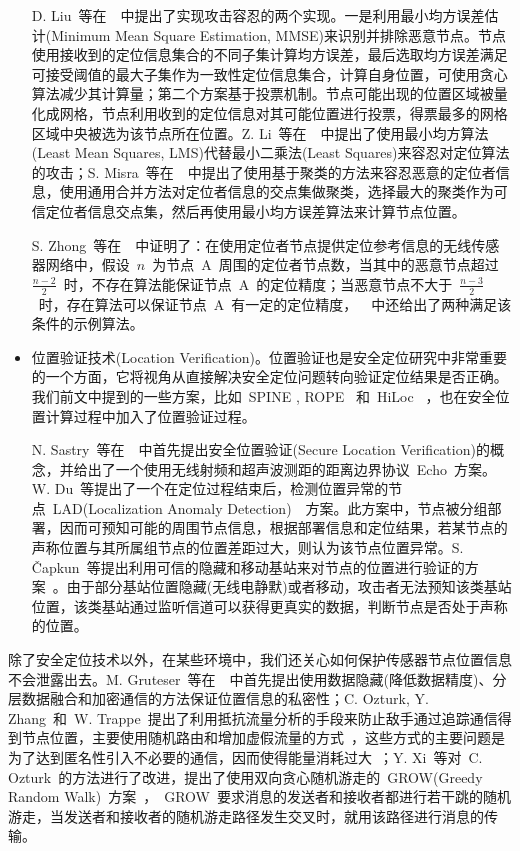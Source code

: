 \documentclass[a4paper,10pt]{article}
\begin{document}
\begin{itemize}
D. Liu~等在~\cite{Liu2005b, Liu2008a}~中提出了实现攻击容忍的两个实现。一是利用最小均方误差估计(Minimum Mean Square Estimation, MMSE)来识别并排除恶意节点。节点使用接收到的定位信息集合的不同子集计算均方误差，最后选取均方误差满足可接受阈值的最大子集作为一致性定位信息集合，计算自身位置，可使用贪心算法减少其计算量；第二个方案基于投票机制。节点可能出现的位置区域被量化成网格，节点利用收到的定位信息对其可能位置进行投票，得票最多的网格区域中央被选为该节点所在位置。Z. Li~等在~\cite{Li2005a}~中提出了使用最小均方算法(Least Mean Squares, LMS)代替最小二乘法(Least Squares)来容忍对定位算法的攻击；S. Misra~等在~\cite{Misra2007}~中提出了使用基于聚类的方法来容忍恶意的定位者信息，使用通用合并方法对定位者信息的交点集做聚类，选择最大的聚类作为可信定位者信息交点集，然后再使用最小均方误差算法来计算节点位置。

S. Zhong~等在~\cite{Zhong2008}~中证明了：在使用定位者节点提供定位参考信息的无线传感器网络中，假设~$n$~为节点~A~周围的定位者节点数，当其中的恶意节点超过~$\frac{n-2}{2}$~时，不存在算法能保证节点~A~的定位精度；当恶意节点不大于~$\frac{n-3}{2}$~时，存在算法可以保证节点~A~有一定的定位精度，~\cite{Zhong2008}~中还给出了两种满足该条件的示例算法。

\item 位置验证技术(Location Verification)。位置验证也是安全定位研究中非常重要的一个方面，它将视角从直接解决安全定位问题转向验证定位结果是否正确。我们前文中提到的一些方案，比如~SPINE \cite{Lazos2005a}, ROPE \cite{Lazos2006}~和~HiLoc \cite{Lazos2005a}~，也在安全位置计算过程中加入了位置验证过程。

N. Sastry~等在~\cite{Sastry2003}~中首先提出安全位置验证(Secure Location Verification)的概念，并给出了一个使用无线射频和超声波测距的距离边界协议~Echo~方案。W. Du~等提出了一个在定位过程结束后，检测位置异常的节点~LAD(Localization Anomaly Detection)~\cite{Du2006}~方案。此方案中，节点被分组部署，因而可预知可能的周围节点信息，根据部署信息和定位结果，若某节点的声称位置与其所属组节点的位置差距过大，则认为该节点位置异常。S. \v{C}apkun~等提出利用可信的隐藏和移动基站来对节点的位置进行验证的方案~\cite{Capkun2006a, Capkun2008}。由于部分基站位置隐藏(无线电静默)或者移动，攻击者无法预知该类基站位置，该类基站通过监听信道可以获得更真实的数据，判断节点是否处于声称的位置。

\end{itemize}

除了安全定位技术以外，在某些环境中，我们还关心如何保护传感器节点位置信息不会泄露出去。M. Gruteser~等在~\cite{Gruteser2003}~中首先提出使用数据隐藏(降低数据精度)、分层数据融合和加密通信的方法保证位置信息的私密性；C. Ozturk, Y. Zhang~和~W. Trappe~提出了利用抵抗流量分析的手段来防止敌手通过追踪通信得到节点位置，主要使用随机路由和增加虚假流量的方式~\cite{Ozturk2004}，这些方式的主要问题是为了达到匿名性引入不必要的通信，因而使得能量消耗过大~\cite{Xiao2006}；Y. Xi~等对~C. Ozturk~的方法进行了改进，提出了使用双向贪心随机游走的~GROW(Greedy Random Walk)~方案~\cite{Xi2006}，~GROW~要求消息的发送者和接收者都进行若干跳的随机游走，当发送者和接收者的随机游走路径发生交叉时，就用该路径进行消息的传输。
\end{document}
